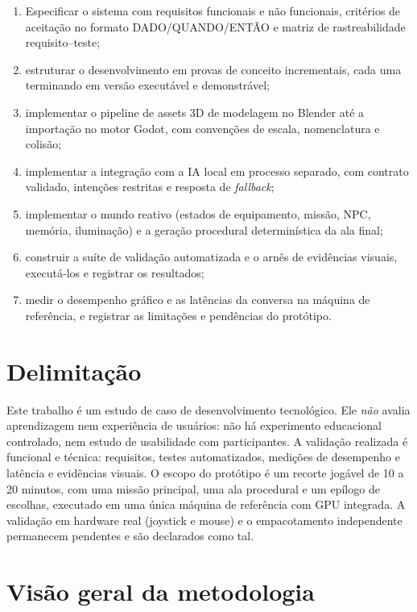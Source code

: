 \begin{enumerate}
  \item Especificar o sistema com requisitos funcionais e não funcionais,
  critérios de aceitação no formato DADO/QUANDO/ENTÃO e matriz de
  rastreabilidade requisito--teste;
  \item estruturar o desenvolvimento em provas de conceito incrementais, cada
  uma terminando em versão executável e demonstrável;
  \item implementar o pipeline de assets 3D de modelagem no Blender até a
  importação no motor Godot, com convenções de escala, nomenclatura e colisão;
  \item implementar a integração com a IA local em processo separado, com
  contrato validado, intenções restritas e resposta de \emph{fallback};
  \item implementar o mundo reativo (estados de equipamento, missão, NPC,
  memória, iluminação) e a geração procedural determinística da ala final;
  \item construir a suíte de validação automatizada e o arnês de evidências
  visuais, executá-los e registrar os resultados;
  \item medir o desempenho gráfico e as latências da conversa na máquina de
  referência, e registrar as limitações e pendências do protótipo.
\end{enumerate}

\section{Delimitação}
\label{sec:delimitacao}

Este trabalho é um estudo de caso de desenvolvimento tecnológico. Ele
\emph{não} avalia aprendizagem nem experiência de usuários: não há
experimento educacional controlado, nem estudo de usabilidade com
participantes. A validação realizada é funcional e técnica: requisitos,
testes automatizados, medições de desempenho e latência e evidências visuais.
O escopo do protótipo é um recorte jogável de 10 a 20 minutos, com uma missão
principal, uma ala procedural e um epílogo de escolhas, executado em uma
única máquina de referência com GPU integrada. A validação em hardware real
(joystick e mouse) e o empacotamento independente permanecem pendentes e são
declarados como tal.

\section{Visão geral da metodologia}
\label{sec:metodologia_visao}

